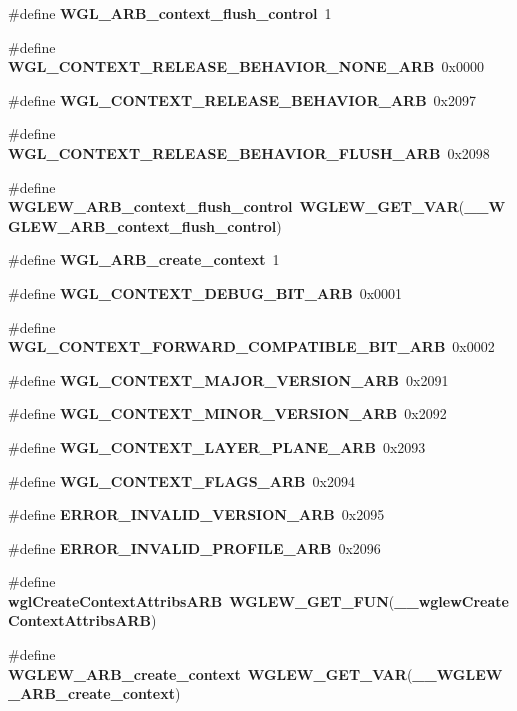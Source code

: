 \begin{DoxyCompactItemize}
\item 
\#define {\bf W\+G\+L\+\_\+\+A\+R\+B\+\_\+context\+\_\+flush\+\_\+control}~1
\item 
\#define {\bf W\+G\+L\+\_\+\+C\+O\+N\+T\+E\+X\+T\+\_\+\+R\+E\+L\+E\+A\+S\+E\+\_\+\+B\+E\+H\+A\+V\+I\+O\+R\+\_\+\+N\+O\+N\+E\+\_\+\+A\+RB}~0x0000
\item 
\#define {\bf W\+G\+L\+\_\+\+C\+O\+N\+T\+E\+X\+T\+\_\+\+R\+E\+L\+E\+A\+S\+E\+\_\+\+B\+E\+H\+A\+V\+I\+O\+R\+\_\+\+A\+RB}~0x2097
\item 
\#define {\bf W\+G\+L\+\_\+\+C\+O\+N\+T\+E\+X\+T\+\_\+\+R\+E\+L\+E\+A\+S\+E\+\_\+\+B\+E\+H\+A\+V\+I\+O\+R\+\_\+\+F\+L\+U\+S\+H\+\_\+\+A\+RB}~0x2098
\item 
\#define {\bf W\+G\+L\+E\+W\+\_\+\+A\+R\+B\+\_\+context\+\_\+flush\+\_\+control}~{\bf W\+G\+L\+E\+W\+\_\+\+G\+E\+T\+\_\+\+V\+AR}({\bf \+\_\+\+\_\+\+W\+G\+L\+E\+W\+\_\+\+A\+R\+B\+\_\+context\+\_\+flush\+\_\+control})
\item 
\#define {\bf W\+G\+L\+\_\+\+A\+R\+B\+\_\+create\+\_\+context}~1
\item 
\#define {\bf W\+G\+L\+\_\+\+C\+O\+N\+T\+E\+X\+T\+\_\+\+D\+E\+B\+U\+G\+\_\+\+B\+I\+T\+\_\+\+A\+RB}~0x0001
\item 
\#define {\bf W\+G\+L\+\_\+\+C\+O\+N\+T\+E\+X\+T\+\_\+\+F\+O\+R\+W\+A\+R\+D\+\_\+\+C\+O\+M\+P\+A\+T\+I\+B\+L\+E\+\_\+\+B\+I\+T\+\_\+\+A\+RB}~0x0002
\item 
\#define {\bf W\+G\+L\+\_\+\+C\+O\+N\+T\+E\+X\+T\+\_\+\+M\+A\+J\+O\+R\+\_\+\+V\+E\+R\+S\+I\+O\+N\+\_\+\+A\+RB}~0x2091
\item 
\#define {\bf W\+G\+L\+\_\+\+C\+O\+N\+T\+E\+X\+T\+\_\+\+M\+I\+N\+O\+R\+\_\+\+V\+E\+R\+S\+I\+O\+N\+\_\+\+A\+RB}~0x2092
\item 
\#define {\bf W\+G\+L\+\_\+\+C\+O\+N\+T\+E\+X\+T\+\_\+\+L\+A\+Y\+E\+R\+\_\+\+P\+L\+A\+N\+E\+\_\+\+A\+RB}~0x2093
\item 
\#define {\bf W\+G\+L\+\_\+\+C\+O\+N\+T\+E\+X\+T\+\_\+\+F\+L\+A\+G\+S\+\_\+\+A\+RB}~0x2094
\item 
\#define {\bf E\+R\+R\+O\+R\+\_\+\+I\+N\+V\+A\+L\+I\+D\+\_\+\+V\+E\+R\+S\+I\+O\+N\+\_\+\+A\+RB}~0x2095
\item 
\#define {\bf E\+R\+R\+O\+R\+\_\+\+I\+N\+V\+A\+L\+I\+D\+\_\+\+P\+R\+O\+F\+I\+L\+E\+\_\+\+A\+RB}~0x2096
\item 
\#define {\bf wgl\+Create\+Context\+Attribs\+A\+RB}~{\bf W\+G\+L\+E\+W\+\_\+\+G\+E\+T\+\_\+\+F\+UN}({\bf \+\_\+\+\_\+wglew\+Create\+Context\+Attribs\+A\+RB})
\item 
\#define {\bf W\+G\+L\+E\+W\+\_\+\+A\+R\+B\+\_\+create\+\_\+context}~{\bf W\+G\+L\+E\+W\+\_\+\+G\+E\+T\+\_\+\+V\+AR}({\bf \+\_\+\+\_\+\+W\+G\+L\+E\+W\+\_\+\+A\+R\+B\+\_\+create\+\_\+context})

\end{DoxyCompactItemize}
